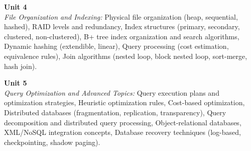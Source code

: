 \noindent\textbf{Unit 4} \\
\textit{File Organization and Indexing:} Physical file organization (heap, sequential, hashed), RAID levels and redundancy, Index structures (primary, secondary, clustered, non-clustered), B+ tree index organization and search algorithms, Dynamic hashing (extendible, linear), Query processing (cost estimation, equivalence rules), Join algorithms (nested loop, block nested loop, sort-merge, hash join).

\vspace{0.3cm}

\noindent\textbf{Unit 5} \\
\textit{Query Optimization and Advanced Topics:} Query execution plans and optimization strategies, Heuristic optimization rules, Cost-based optimization, Distributed databases (fragmentation, replication, transparency), Query decomposition and distributed query processing, Object-relational databases, XML/NoSQL integration concepts, Database recovery techniques (log-based, checkpointing, shadow paging).

\newpage
{}
